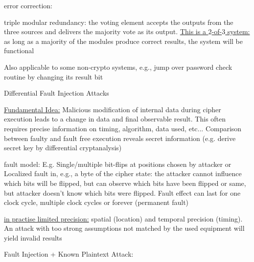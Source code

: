 \documentclass[landscape, a4paper]{article}
\begin{document}
\begin{minipage}[t]{0.2\linewidth}
\begin{betterlist}
\begin{betterlist}
\begin{betterlist}
			\end{betterlist}
			\item \alert{error correction:}
			\begin{betterlist}
				\item \alert{triple modular redundancy:} the voting element accepts the outputs from the three sources and delivers the \alert{majority vote as its output}. \underline{This is a $2$-of-$3$ system:} as long as a majority of the modules produce correct results, the system will be functional
			\end{betterlist}
		\end{betterlist}
	\end{betterlist}
	\begin{betterlist}
		\item Also applicable to some non-crypto systems, e.g., jump over password check routine by changing its result bit
		\item \alert{Differential Fault Injection Attacks}
		\begin{betterlist}
			\item \underline{Fundamental Idea:} Malicious modification of internal data during cipher execution leads to a change in data and final observable result. This often requires precise information on timing, algorithm, data used, etc... Comparison between faulty and fault free execution reveals secret information (e.g. derive secret key by differential cryptanalysis)
			\item \alert{fault model:} E.g. Single/multiple bit-flips at positions chosen by attacker or Localized fault in, e.g., a byte of the cipher state: the attacker cannot influence which bits will be flipped, but can observe which bits have been flipped or same, but attacker doesn’t know which bits were flipped. Fault effect can last for one clock cycle, multiple clock cycles or forever (permanent fault)
			\begin{betterlist}
				\item \underline{in practise limited precision:} spatial (location) and temporal precision (timing). An attack with too strong assumptions not matched by the used equipment will yield invalid results
			\end{betterlist}
			\item \alert{Fault Injection + Known Plaintext Attack:}

\end{betterlist}
\end{betterlist}
\end{minipage}
\end{document}
